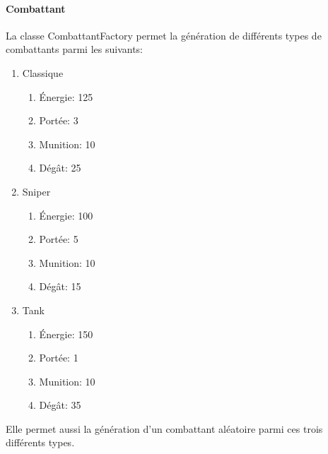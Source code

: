 \documentclass[a4paper,12pt]{article}
\begin{document}
	\paragraph{Combattant}
	\label{sec:stats}
	La classe CombattantFactory permet la génération de différents types de combattants parmi les suivants:
	\begin{enumerate}
		\item Classique
		\begin{enumerate}
			\item Énergie: 125
			\item Portée: 3
			\item Munition: 10
			\item Dégât: 25
		\end{enumerate}
		\item Sniper
		\begin{enumerate}
			\item Énergie: 100
			\item Portée: 5
			\item Munition: 10
			\item Dégât: 15
		\end{enumerate}
		\item Tank
		\begin{enumerate}
			\item Énergie: 150
			\item Portée: 1
			\item Munition: 10
			\item Dégât: 35
		\end{enumerate} 
	\end{enumerate}
	Elle permet aussi la génération d'un combattant aléatoire parmi ces trois différents types. 
	
\end{document}
